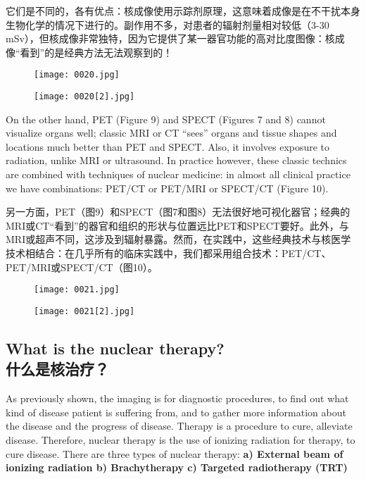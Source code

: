 \documentclass[dvipsnames, svgnames,a4paper,11pt]{article}
\begin{document}
它们是不同的，各有优点：核成像使用示踪剂原理，这意味着成像是在不干扰本身生物化学的情况下进行的。副作用不多，对患者的辐射剂量相对较低（3-30 mSv），但核成像非常独特，因为它提供了某一器官功能的高对比度图像：核成像“看到”的是经典方法无法观察到的！

\begin{figure}[htbp]
      \centering
      \texttt{[image: 0020.jpg]}
       \label{fig7}
  \end{figure}

  \begin{figure}[htbp]
      \centering
      \texttt{[image: 0020[2].jpg]}
       \label{fig8}
  \end{figure}
On the other hand, PET (Figure 9) and SPECT (Figures 7 and 8) cannot visualize organs well; classic MRI or CT “sees” organs and tissue shapes and locations much better than PET and SPECT. Also, it involves exposure to radiation, unlike MRI or ultrasound. In practice however, these classic technics are combined with techniques of nuclear medicine: in almost all clinical practice we have combinations: PET/CT or PET/MRI or SPECT/CT (Figure 10).

另一方面，PET（图9）和SPECT（图7和图8）无法很好地可视化器官；经典的MRI或CT“看到”的器官和组织的形状与位置远比PET和SPECT要好。此外，与MRI或超声不同，这涉及到辐射暴露。然而，在实践中，这些经典技术与核医学技术相结合：在几乎所有的临床实践中，我们都采用组合技术：PET/CT、PET/MRI或SPECT/CT（图10）。
\begin{figure}[htbp]
      \centering
      \texttt{[image: 0021.jpg]}
       \label{fig9}
  \end{figure}
  \begin{figure}[htbp]
      \centering
      \texttt{[image: 0021[2].jpg]}
       \label{fig10}
  \end{figure}
\subsection{What is the nuclear therapy?\\什么是核治疗？}
As previously shown, the imaging is for diagnostic procedures, to find out what kind of disease patient is suffering from, and to gather more information about the disease and the progress of disease. Therapy is a procedure to cure, alleviate disease. Therefore, nuclear therapy is the use of ionizing radiation for therapy, to cure disease. There are three types of nuclear therapy: \textbf{a) External beam of ionizing radiation b) Brachytherapy c) Targeted radiotherapy (TRT)}
\end{document}
